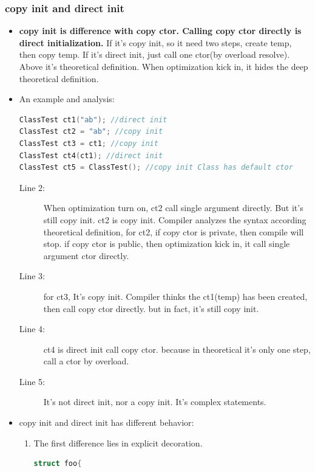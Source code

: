 \documentclass[a4paper,11pt,twoside]{book}
\begin{document}
\subsubsection{copy init and direct init}
\begin{itemize}

	\item \textbf{copy init is difference with copy ctor. Calling copy ctor directly is direct initialization.} If it's copy init, so it need two steps, create temp, then copy temp.  If it's direct init, just call one ctor(by overload resolve). Above it's theoretical definition. When optimization kick in, it hides the deep theoretical definition.
	
	\item An example and analysis:
\begin{lstlisting}[frame=single, language=c++]
ClassTest ct1("ab"); //direct init
ClassTest ct2 = "ab"; //copy init 
ClassTest ct3 = ct1; //copy init
ClassTest ct4(ct1); //direct init
ClassTest ct5 = ClassTest(); //copy init Class has default ctor
\end{lstlisting}
\begin{description}
	\item[Line 2:]  When optimization turn on, ct2 call single argument directly. But it's still copy init. ct2 is copy init. Compiler analyzes the syntax according theoretical definition, for ct2, if copy ctor is private, then compile will stop. if copy ctor is public, then optimization kick in, it call single argument ctor directly.
	
	\item[Line 3:] for ct3, It's copy init. Compiler thinks the ct1(temp) has been created, then call copy ctor directly. but in fact, it's still copy init.
	
	\item[Line 4:] ct4 is direct init call copy ctor. because in theoretical it's only one step, call a ctor by overload. 
	
	\item[Line 5:] It's not direct init, nor a copy init. It's complex statements.
	
\end{description}

	\item copy init and direct init has different behavior:
	\begin{enumerate}
		\item The first difference lies in explicit decoration.
\begin{lstlisting}[frame=single, language=c++]
struct foo{
 

\end{lstlisting}
\end{enumerate}
\end{itemize}
\end{document}
